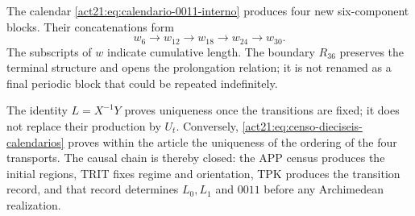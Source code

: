 The calendar \eqref{act21:eq:calendario-0011-interno} produces four new
six-component blocks. Their concatenations form
\[
 w_6\longrightarrow w_{12}\longrightarrow w_{18}
 \longrightarrow w_{24}\longrightarrow w_{30}.
\]
The subscripts of \(w\) indicate cumulative length. The boundary \(R_{36}\) preserves the terminal structure and opens the prolongation relation; it is not renamed as a final periodic block that could be repeated indefinitely.

The identity \(L=X^{-1}Y\) proves uniqueness once the transitions are
fixed; it does not replace their production by \(U_t\). Conversely,
\eqref{act21:eq:censo-dieciseis-calendarios} proves within the article the uniqueness
of the ordering of the four transports. The causal chain is thereby closed:
the APP census produces the initial regions, TRIT fixes regime and
orientation, TPK produces the transition record, and that record
determines \(L_0,L_1\) and \(0011\) before any Archimedean realization.


\par\endgroup
